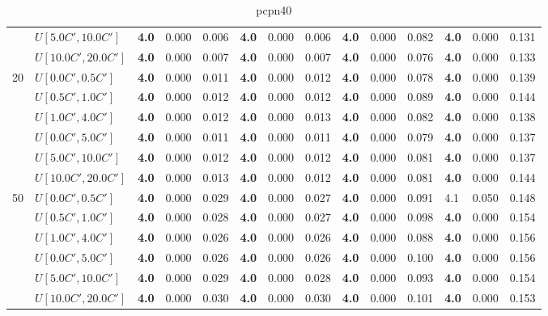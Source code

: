 \begin{table}[h]
{\begin{tabular}{|l|l||l|l|l||l|l|l||l|l|l||l|l|l|}
       & $U[5.0C',10.0C']$ & \textbf{4.0} & 0.000 & 0.006 & \textbf{4.0} & 0.000 & 0.006 & \textbf{4.0} & 0.000 & 0.082 & \textbf{4.0} & 0.000 & 0.131 \\
       & $U[10.0C',20.0C']$ & \textbf{4.0} & 0.000 & 0.007 & \textbf{4.0} & 0.000 & 0.007 & \textbf{4.0} & 0.000 & 0.076 & \textbf{4.0} & 0.000 & 0.133 \\
      \hline\hline
      \multirow{6}{*}{20} & $U[0.0C',0.5C']$ & \textbf{4.0} & 0.000 & 0.011 & \textbf{4.0} & 0.000 & 0.012 & \textbf{4.0} & 0.000 & 0.078 & \textbf{4.0} & 0.000 & 0.139 \\
       & $U[0.5C',1.0C']$ & \textbf{4.0} & 0.000 & 0.012 & \textbf{4.0} & 0.000 & 0.012 & \textbf{4.0} & 0.000 & 0.089 & \textbf{4.0} & 0.000 & 0.144 \\
       & $U[1.0C',4.0C']$ & \textbf{4.0} & 0.000 & 0.012 & \textbf{4.0} & 0.000 & 0.013 & \textbf{4.0} & 0.000 & 0.082 & \textbf{4.0} & 0.000 & 0.138 \\
       & $U[0.0C',5.0C']$ & \textbf{4.0} & 0.000 & 0.011 & \textbf{4.0} & 0.000 & 0.011 & \textbf{4.0} & 0.000 & 0.079 & \textbf{4.0} & 0.000 & 0.137 \\
       & $U[5.0C',10.0C']$ & \textbf{4.0} & 0.000 & 0.012 & \textbf{4.0} & 0.000 & 0.012 & \textbf{4.0} & 0.000 & 0.081 & \textbf{4.0} & 0.000 & 0.137 \\
       & $U[10.0C',20.0C']$ & \textbf{4.0} & 0.000 & 0.013 & \textbf{4.0} & 0.000 & 0.012 & \textbf{4.0} & 0.000 & 0.081 & \textbf{4.0} & 0.000 & 0.144 \\
      \hline\hline
      \multirow{6}{*}{50} & $U[0.0C',0.5C']$ & \textbf{4.0} & 0.000 & 0.029 & \textbf{4.0} & 0.000 & 0.027 & \textbf{4.0} & 0.000 & 0.091 & 4.1 & 0.050 & 0.148 \\
       & $U[0.5C',1.0C']$ & \textbf{4.0} & 0.000 & 0.028 & \textbf{4.0} & 0.000 & 0.027 & \textbf{4.0} & 0.000 & 0.098 & \textbf{4.0} & 0.000 & 0.154 \\
       & $U[1.0C',4.0C']$ & \textbf{4.0} & 0.000 & 0.026 & \textbf{4.0} & 0.000 & 0.026 & \textbf{4.0} & 0.000 & 0.088 & \textbf{4.0} & 0.000 & 0.156 \\
       & $U[0.0C',5.0C']$ & \textbf{4.0} & 0.000 & 0.026 & \textbf{4.0} & 0.000 & 0.026 & \textbf{4.0} & 0.000 & 0.100 & \textbf{4.0} & 0.000 & 0.156 \\
       & $U[5.0C',10.0C']$ & \textbf{4.0} & 0.000 & 0.029 & \textbf{4.0} & 0.000 & 0.028 & \textbf{4.0} & 0.000 & 0.093 & \textbf{4.0} & 0.000 & 0.154 \\
       & $U[10.0C',20.0C']$ & \textbf{4.0} & 0.000 & 0.030 & \textbf{4.0} & 0.000 & 0.030 & \textbf{4.0} & 0.000 & 0.101 & \textbf{4.0} & 0.000 & 0.153 \\
      \hline
      \end{tabular}
      }
      \caption{pcpn40}
      \label{tab:pcpn40}\end{table}


